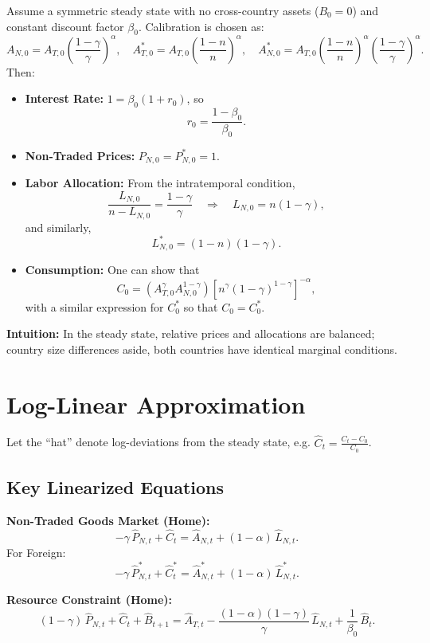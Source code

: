 \documentclass[a4paper,12pt]{article} %
\theoremstyle{nonitalic}
\begin{document}
Assume a symmetric steady state with no cross-country assets (\( B_0=0 \)) and constant discount factor \( \beta_0 \). Calibration is chosen as:
\[
A_{N,0} = A_{T,0}\left(\frac{1-\gamma}{\gamma}\right)^{\alpha}, \quad
A^*_{T,0} = A_{T,0}\left(\frac{1-n}{n}\right)^{\alpha}, \quad
A^*_{N,0} = A_{T,0}\left(\frac{1-n}{n}\right)^{\alpha}\left(\frac{1-\gamma}{\gamma}\right)^{\alpha}.
\]
Then:
\begin{itemize}
    \item \textbf{Interest Rate:} \( 1 = \beta_0(1+r_0) \), so
    \[
    r_0 = \frac{1-\beta_0}{\beta_0}.
    \]
    \item \textbf{Non-Traded Prices:} \( P_{N,0} = P^*_{N,0} = 1 \).
    \item \textbf{Labor Allocation:} From the intratemporal condition, 
    \[
    \frac{L_{N,0}}{n-L_{N,0}} = \frac{1-\gamma}{\gamma} \quad \Rightarrow \quad L_{N,0} = n(1-\gamma),
    \]
    and similarly, 
    \[
    L^*_{N,0} = (1-n)(1-\gamma).
    \]
    \item \textbf{Consumption:} One can show that
    \[
    C_0 = \left(A_{T,0}^{\gamma}A_{N,0}^{1-\gamma}\right)\left[n^{\gamma}(1-\gamma)^{1-\gamma}\right]^{-\alpha},
    \]
    with a similar expression for \( C^*_0 \) so that \( C_0 = C^*_0 \).
\end{itemize}

\textbf{Intuition:} In the steady state, relative prices and allocations are balanced; country size differences aside, both countries have identical marginal conditions.

\section{Log-Linear Approximation}

Let the ``hat'' denote log-deviations from the steady state, e.g. \( \hat{C}_t = \frac{C_t-C_0}{C_0} \).

\subsection*{Key Linearized Equations}

\textbf{Non-Traded Goods Market (Home):}
\[
-\gamma\,\hat{P}_{N,t} + \hat{C}_t = \hat{A}_{N,t} + (1-\alpha)\,\hat{L}_{N,t}. \tag{7a}
\]
For Foreign:
\[
-\gamma\,\hat{P}^*_{N,t} + \hat{C}^*_t = \hat{A}^*_{N,t} + (1-\alpha)\,\hat{L}^*_{N,t}.
\]

\textbf{Resource Constraint (Home):}
\[
(1-\gamma)\,\hat{P}_{N,t} + \hat{C}_t + \hat{B}_{t+1} = \hat{A}_{T,t} - \frac{(1-\alpha)(1-\gamma)}{\gamma}\,\hat{L}_{N,t} + \frac{1}{\beta_0}\,\hat{B}_t. \tag{7b}
\]
\end{document}
